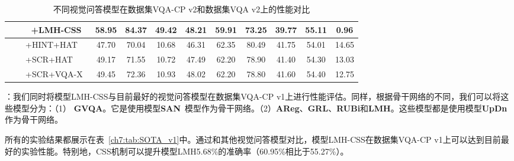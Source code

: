 \begin{table}
\begin{center}
{\begin{tabular}{| l | c c c c | c c c c| c |}
$$                ~~~~+\textbf{LMH-CSS} & \textbf{58.95} & \textbf{84.37} & \textbf{49.42} & \textbf{48.21} & 59.91 & 73.25 & 39.77 & 55.11 & \textbf{0.96}  \\
                \hline\hline
                ~~~~+HINT+HAT~\cite{selvaraju2019taking} & 47.70 & 70.04 & 10.68 & 46.31 & 62.35 & 80.49 & 41.75 & 54.01 & 14.65 \\
                ~~~~+SCR+HAT~\cite{wu2019self} & 49.17 & 71.55 & 10.72 & 47.49 & 62.20 & 78.90 & 41.40 & 54.30 & 13.03  \\
                ~~~~+SCR+VQA-X~\cite{wu2019self} & 49.45 & 72.36 & 10.93 & 48.02 & 62.20 & 78.80 & 41.60 & 54.40 & 12.75  \\
                \hline
            \end{tabular}
        } %
    \end{center}
    \caption{不同视觉问答模型在数据集VQA-CP v2和数据集VQA v2上的性能对比} %
    \label{ch7:tab:SOTA_v2}
\end{table}

\textbf{}：我们同时将模型LMH-CSS与目前最好的视觉问答模型在数据集VQA-CP v1上进行性能评估。同样，根据骨干网络的不同，我们可以将这些模型分为：（1） \textbf{GVQA}。它是使用模型\textbf{SAN}~\cite{yang2016stacked}模型作为骨干网络。（2）\textbf{AReg}、\textbf{GRL}、\textbf{RUBi}和\textbf{LMH}。这些模型都是使用模型\textbf{UpDn}作为骨干网络。

所有的实验结果都展示在表~\ref{ch7:tab:SOTA_v1}中。通过和其他视觉问答模型对比，模型LMH-CSS在数据集VQA-CP v1上可以达到目前最好的实验性能。特别地，CSS机制可以提升模型LMH5.68\%的准确率（60.95\%相比于55.27\%）。

